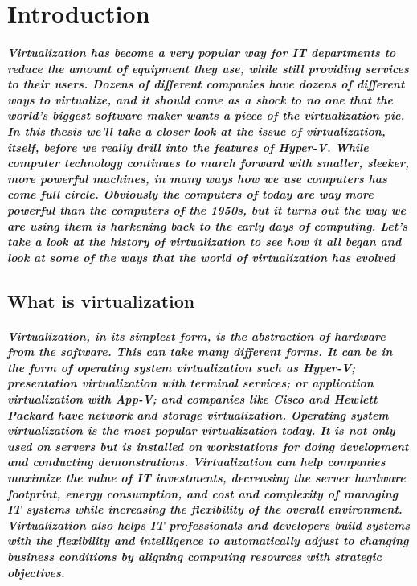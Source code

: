 \chapter{Introduction}

\paragraph{Virtualization has become a very popular way for IT departments to reduce the amount of equipment they use, while still providing services to their users. 
Dozens of different companies have dozens of different ways to virtualize, and it should come as a shock to no one that the world’s biggest software maker wants a 
piece of the virtualization pie. In this thesis we’ll take a closer look at the issue of virtualization, itself, before we really drill into the features of Hyper-V.
While computer technology continues to march forward with smaller, sleeker, more powerful machines, in many ways how we use computers has come full circle. Obviously 
the computers of today are way more powerful than the computers of the 1950s, but it turns out the way we are using them is harkening back to the early days of computing. 
Let’s take a look at the history of virtualization to see how it all began and look at some of the ways that the world of virtualization has evolved}

\section{What is virtualization}

\paragraph{Virtualization, in its simplest form, is the abstraction of hardware from the software. This can take many different forms. It can be in the form of operating system 
virtualization such as Hyper-V; presentation virtualization with terminal services; or application virtualization with App-V; and companies like Cisco and Hewlett 
Packard have network and storage virtualization. Operating system virtualization is the most popular virtualization today. It is not only used on servers but is installed 
on workstations for doing development and conducting demonstrations. Virtualization can help companies maximize the value of IT investments, decreasing the server hardware 
footprint, energy consumption, and cost and complexity of managing IT systems while increasing the flexibility of the overall environment. Virtualization also helps IT 
professionals and developers build systems with the flexibility and intelligence to automatically adjust to changing business conditions by aligning computing resources 
with strategic objectives.}

